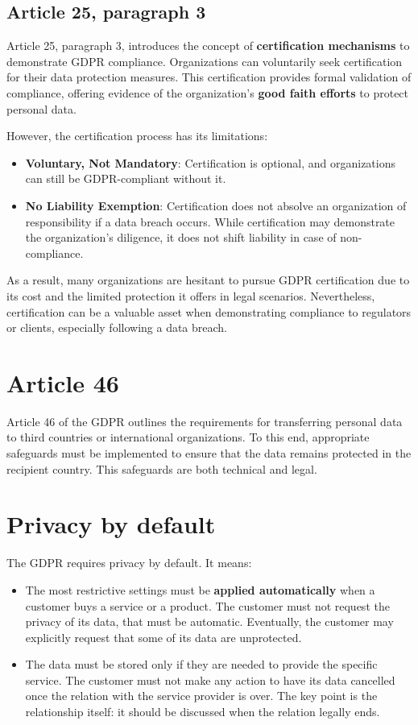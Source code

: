 \subsection{Article 25, paragraph 3}
Article 25, paragraph 3, introduces the concept of
\textbf{certification mechanisms} to demonstrate GDPR compliance.
Organizations can voluntarily seek certification for their data
protection measures. This certification provides formal validation of
compliance, offering evidence of the organization’s \textbf{good faith
efforts} to protect personal data.  

However, the certification process has its limitations:  
\begin{itemize}
  \item \textbf{Voluntary, Not Mandatory}: Certification is optional,
    and organizations can still be GDPR-compliant without it.  
  \item \textbf{No Liability Exemption}: Certification does not
    absolve an organization of responsibility if a data breach occurs.
    While certification may demonstrate the organization's diligence,
    it does not shift liability in case of non-compliance.  
\end{itemize}

As a result, many organizations are hesitant to pursue GDPR
certification due to its cost and the limited protection it offers in
legal scenarios. Nevertheless, certification can be a valuable asset
when demonstrating compliance to regulators or clients, especially
following a data breach.

\section{Article 46} 
Article 46 of the GDPR outlines the requirements for transferring
personal data to third countries or international organizations.
To this end, appropriate safeguards must be implemented to ensure that 
the data remains protected in the recipient country. This safeguards
are both technical and legal.

\section{Privacy by default}
The GDPR requires privacy by default. It means:
\begin{itemize}
  \item The most restrictive settings must be \textbf{applied
    automatically} when a customer buys a service or a product. The
    customer must not request the privacy of its data, that must be
    automatic. Eventually, the customer may explicitly request that
    some of its data are unprotected.
  \item The data must be stored only if they are needed to provide the
    specific service. The customer must not make any action to have
    its data cancelled once the relation with the service provider is
    over. The key point is the relationship itself: it should be
    discussed when the relation legally ends.
\end{itemize}
